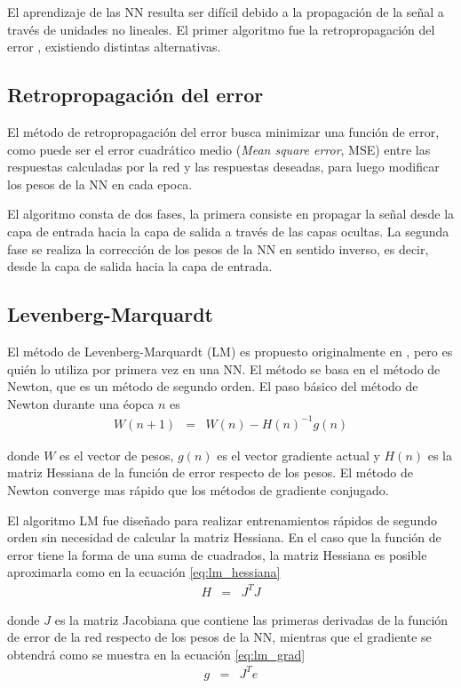 El aprendizaje de las NN resulta ser difícil debido a la propagación de la señal a través de unidades no lineales. El primer algoritmo fue la retropropagación del error \cite{Werbos1974, Rumelhart1986}, existiendo distintas alternativas.

\subsection{Retropropagación del error}
El método de retropropagación del error busca minimizar una función de error, como puede ser el error cuadrático medio ({\em Mean square error}, MSE) entre las respuestas calculadas por la red y las respuestas deseadas, para luego modificar los pesos de la NN en cada epoca.

El algoritmo consta de dos fases, la primera consiste en propagar la señal desde la capa de entrada hacia la capa de salida a través de las capas ocultas. La segunda fase se realiza la corrección de los pesos de la NN en sentido inverso, es decir, desde la capa de salida hacia la capa de entrada.

\subsection{Levenberg-Marquardt}
El método de Levenberg-Marquardt (LM) \cite{Levenberg1944, Marquardt1963} es propuesto originalmente en \cite{Marquardt1963}, pero es  quién lo utiliza por primera vez en una NN. El método se basa en el método de Newton, que es un método de segundo orden. El paso básico del método de Newton durante una éopca $n$ es
\begin{eqnarray}
	W(n + 1) &=& W(n) - H(n)^{-1}g(n)
\end{eqnarray}

donde $W$ es el vector de pesos, $g(n)$ es el vector gradiente actual y $H(n)$ es la matriz Hessiana de la función de error respecto de los pesos. El método de Newton converge mas rápido que los métodos de gradiente conjugado.

El algoritmo LM fue diseñado para realizar entrenamientos rápidos de segundo orden sin necesidad de calcular la matriz Hessiana. En el caso que la función de error tiene la forma de una suma de cuadrados, la matriz Hessiana es posible aproximarla como en la ecuación \ref{eq:lm_hessiana}
\begin{eqnarray}
	H &=& J^{T}J\label{eq:lm_hessiana}
\end{eqnarray}

 donde $J$ es la matriz Jacobiana que contiene las primeras derivadas de la función de error de la red respecto de los pesos de la NN, mientras que el gradiente se obtendrá como se muestra en la ecuación \ref{eq:lm_grad}
 \begin{eqnarray}
	 g &=& J^{T}e\label{eq:lm_grad}
 \end{eqnarray}

